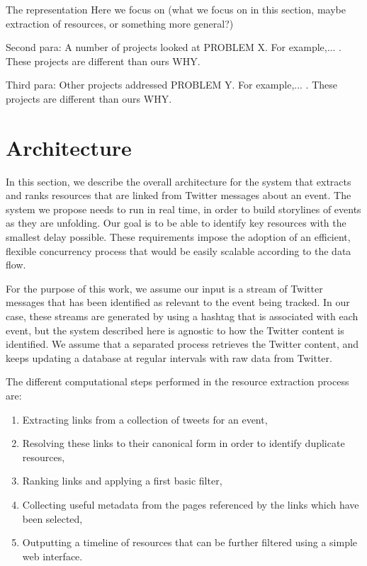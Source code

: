 \documentclass{sig-alternate}
\begin{document}
The representation
Here we focus on (what we focus on in this section, maybe extraction of resources, or something more general?)

Second para: A number of projects looked at PROBLEM X. For example,... . These projects are different than ours WHY.

Third para: Other projects addressed PROBLEM Y. For example,... . These projects are different than ours WHY.


\section{Architecture}
\label{sec:architecture}
In this section, we describe the overall architecture for the system that extracts and ranks resources that are linked from Twitter messages about an event. The system we propose needs to run in real time, in order to build storylines of events as they are unfolding. Our goal is to be able to identify key resources with the smallest delay possible. These requirements impose the adoption of an efficient, flexible concurrency process that would be easily scalable according to the data flow.

For the purpose of this work, we assume our input is a stream of Twitter messages that has been identified as relevant to the event being tracked. In our case, these streams are generated by using a hashtag that is associated with each event, but the system described here is agnostic to how the Twitter content is identified. We assume that a separated process retrieves the Twitter content, and keeps updating a database at regular intervals with raw data from Twitter.

The different computational steps performed in the resource extraction process are:
\begin{enumerate}
 \item Extracting links from a collection of tweets for an event,
 \item Resolving these links to their canonical form in order to identify duplicate resources,
 \item Ranking links and applying a first basic filter,
 \item Collecting useful metadata from the pages referenced by the links which have been selected,
 \item Outputting a timeline of resources that can be further filtered using a simple web interface.
\end{enumerate}
\end{document}

